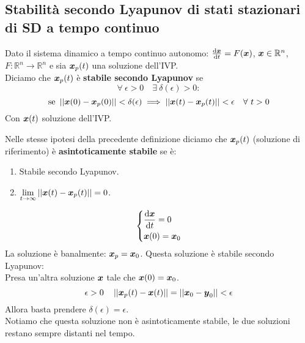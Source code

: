 \subsection{Stabilità secondo Lyapunov di stati stazionari di SD a tempo continuo}%
\begin{defn}
    Dato il sistema dinamico a tempo continuo autonomo: $\frac{\text{d} \boldsymbol{x}}{\text{d} t} = F(\boldsymbol{x})$, $\boldsymbol{x}\in \mathbb{R}^n$, $F: \mathbb{R}^n\to \mathbb{R}^n$ e sia $\boldsymbol{x}_p(t)$ una soluzione dell'IVP.\\
    Diciamo che $\boldsymbol{x}_p(t)$ è \textbf{stabile secondo Lyapunov} se
    \[
    \forall \ \epsilon  > 0 \quad \exists \ \delta (\epsilon)>0:
    \] 
    \[
	\text{se } \left|\left|\boldsymbol{x}(0)-\boldsymbol{x}_p(0)\right|\right|< \delta (\epsilon) \implies  
	\left|\left|\boldsymbol{x} (t)-\boldsymbol{x}_p(t)\right|\right|<\epsilon  \quad \forall \ t >0
    \] 
    Con $\boldsymbol{x} (t)$ soluzione dell'IVP.
\end{defn}
\noindent
\begin{defn}
    Nelle stesse ipotesi della precedente definizione diciamo che $\boldsymbol{x}_p(t)$ (soluzione di riferimento) è \textbf{asintoticamente stabile} se è:
    \begin{enumerate}
        \item Stabile secondo Lyapunov.
	\item $\lim\limits_{t \to \infty} \left|\left|\boldsymbol{x}(t)-\boldsymbol{x}_p(t)\right|\right| = 0$.
    \end{enumerate}
\end{defn}
\noindent
\begin{exmp}
    \[\begin{dcases}
        \frac{\text{d} \boldsymbol{x}}{\text{d} t} = 0\\
	\boldsymbol{x}(0)=\boldsymbol{x}_0
    \end{dcases}\] 
    La soluzione è banalmente: $\boldsymbol{x}_p = \boldsymbol{x}_0$. Questa soluzione è stabile secondo Lyapunov:\\
    Presa un'altra soluzione $\boldsymbol{x}$ tale che $\boldsymbol{x} (0)=\boldsymbol{x}_0$.
    \[
	\epsilon >0 \quad \left|\left|\boldsymbol{x}_p(t) - \boldsymbol{x} (t)\right|\right|=
	\left|\left|\boldsymbol{x}_0 - \boldsymbol{y}_0 \right|\right| < \epsilon
    \] 
    Allora basta prendere $\delta (\epsilon) = \epsilon$.\\
    Notiamo che questa soluzione non è asintoticamente stabile, le due soluzioni restano sempre distanti nel tempo.
\end{exmp}
\noindent

